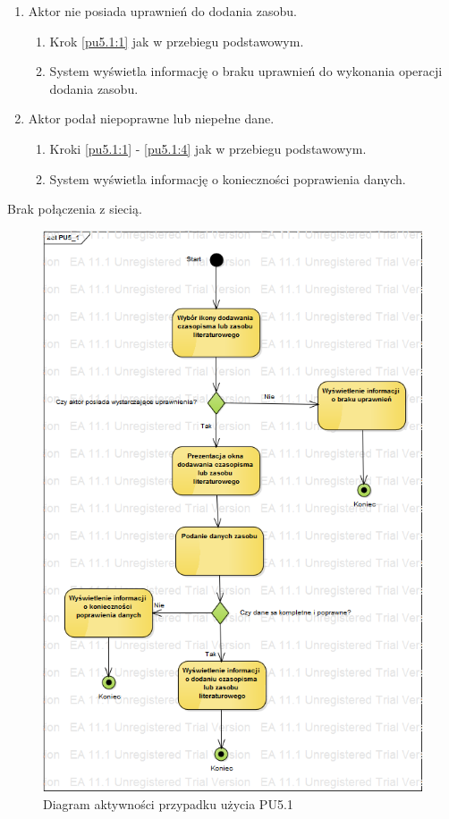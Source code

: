 \begin{enumerate}
\item Aktor nie posiada uprawnień do dodania zasobu.
	\begin{enumerate}[label*=\arabic*.]
		\item Krok \ref{pu5.1:1} jak w przebiegu podstawowym.
		\item System wyświetla informację o braku uprawnień do wykonania operacji dodania zasobu.
	\end{enumerate}
\item Aktor podał niepoprawne lub niepełne dane.
	\begin{enumerate}[label*=\arabic*.]
		\item Kroki \ref{pu5.1:1} - \ref{pu5.1:4} jak w przebiegu podstawowym.
		\item System wyświetla informację o konieczności poprawienia danych.
	\end{enumerate}
\end{enumerate}

Brak połączenia z siecią.

\begin{figure}[h!]
	\centering
	\includegraphics[scale=0.6]{img/diagrams/activityDiagrams/PU5_1}
	\caption{Diagram aktywności przypadku użycia PU5.1 \label{fig:labelADPU5.1}}
\end{figure}

